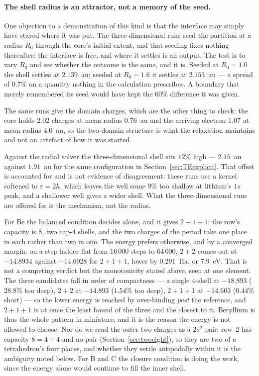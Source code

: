 \documentclass[11pt]{article}
\begin{document}
\paragraph{The shell radius is an attractor, not a memory of the seed.} One objection to a
demonstration of this kind is that the interface may simply have stayed where it was put. The
three-dimensional runs seed the partition at a radius $R_0$ through the core's initial extent, and
that seeding fixes nothing thereafter: the interface is free, and where it settles is an output. The
test is to vary $R_0$ and see whether the outcome is the same, and it is. Seeded at $R_0=1.0$ the
shell settles at $2.139$~au; seeded at $R_0=1.6$ it settles at $2.153$~au --- a spread of $0.7\%$ on
a quantity nothing in the calculation prescribes. A boundary that merely remembered its seed would
have kept the $60\%$ difference it was given.

The same runs give the domain charges, which are the other thing to check: the core holds $2.02$
charges at mean radius $0.76$~au and the arriving electron $1.07$ at mean radius $4.0$~au, so the
two-domain structure is what the relaxation maintains and not an artefact of how it was started.

Against the radial solver the three-dimensional shell sits $12\%$ high --- $2.15$~au against
$1.91$~au for the same configuration in Section~\ref{sec:TEexplicit}. That offset is accounted for
and is not evidence of disagreement: these runs use a kernel softened to $\varepsilon=2h$, which
leaves the well some $9\%$ too shallow at lithium's $1s$ peak, and a shallower well gives a wider
shell. What the three-dimensional runs are offered for is the mechanism, not the radius.

For Be the balanced condition decides alone, and it gives $2{+}1{+}1$: the row's capacity is
$8$, two cap-4 shells, and the two charges of the period take one place in each rather than two
in one. The energy prefers otherwise, and by a converged margin: on a step ladder flat from
$16\,000$ steps to $64\,000$, $2{+}2$ comes out at $-14.8934$ against $-14.6028$ for $2{+}1{+}1$,
lower by $0.291$~Ha, or $7.9$~eV. That is not a competing verdict but the monotonicity stated
above, seen at one element. The three candidates fall in order of compactness --- a single
$4$-shell at $-18.893$ ($28.8\%$ too deep), $2{+}2$ at $-14.893$ ($1.54\%$ too deep), $2{+}1{+}1$
at $-14.603$ ($0.44\%$ short) --- so the lower energy is reached by over-binding \emph{past} the
reference, and $2{+}1{+}1$ is at once the least bound of the three and the closest to it.
Beryllium is thus the whole pattern in miniature, and it is the reason the energy is not allowed
to choose. Nor do we read the outer
two charges as a $2s^2$ pair: row~2 has capacity $8=4{+}4$ and no pair
(Section~\ref{sec:twoeight}), so they are two of a tetrahedron's four places, and whether they
settle antipodally within it is the ambiguity noted below. For B and C the closure condition is
doing the work, since the energy alone would continue to fill the inner shell.
\end{document}
